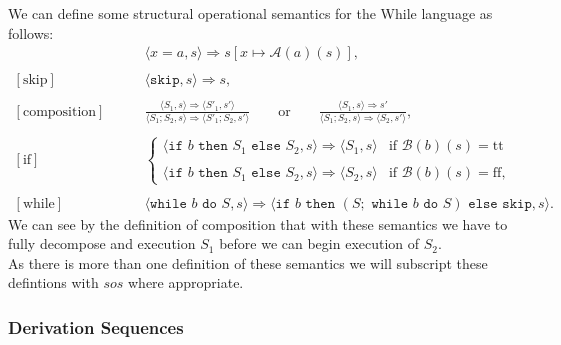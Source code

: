 \newpage

\noindent
We can define some structural operational semantics for the While 
language as follows:
\begin{align*}
  [\text{assignment}]& \qquad \langle x=a, s \rangle \Rightarrow s[x\mapsto \mathcal{A}(a)(s)], \\ \\
  [\text{skip}]& \qquad \langle \texttt{skip}, s \rangle \Rightarrow s, \\ \\
  [\text{composition}]& \qquad \frac{
    \langle S_1, s \rangle \Rightarrow \langle S'_1, s' \rangle
  }{\langle S_1;S_2, s \rangle \Rightarrow \langle S'_1;S_2, s' \rangle} 
  \qquad \text{or} \qquad \frac{
    \langle S_1, s \rangle \Rightarrow s'
  }{\langle S_1;S_2, s \rangle \Rightarrow \langle S_2, s' \rangle}, \\ \\
  [\text{if}]& \qquad \begin{cases}
    \langle \texttt{if } b \texttt{ then } S_1 \texttt{ else } S_2, s \rangle \Rightarrow 
    \langle S_1, s \rangle
    & \text{if } \mathcal{B}(b)(s) = \text{tt} \\ \\
    \langle \texttt{if } b \texttt{ then } S_1 \texttt{ else } S_2, s \rangle \Rightarrow
    \langle S_2, s \rangle
    & \text{if } \mathcal{B}(b)(s) = \text{ff},
  \end{cases} \\ \\
  [\text{while}]& \qquad \langle \texttt{while } b \texttt{ do } S, s \rangle \Rightarrow
    \langle \texttt{if } b \texttt{ then } (S; \texttt{ while } b \texttt{ do } S)
    \texttt{ else skip}, s \rangle.
\end{align*} We can see by the definition of composition that with these 
semantics we have to fully decompose and execution $S_1$ before
we can begin execution of $S_2$.
\\[\baselineskip]
As there is more than one definition of these semantics
we will subscript these defintions with $sos$ where appropriate.

\subsubsection{Derivation Sequences}


